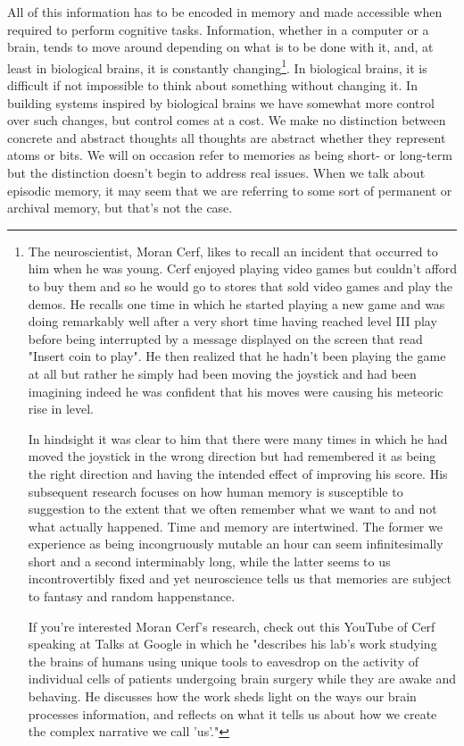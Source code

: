 All of this information has to be encoded in memory and made accessible when required to perform cognitive tasks. Information, whether in a computer or a brain, tends to move around depending on what is to be done with it, and, at least in biological brains, it is constantly changing\footnote{%
%
  The neuroscientist, Moran Cerf, likes to recall an incident that occurred to him when he was young. Cerf enjoyed playing video games but couldn't afford to buy them and so he would go to stores that sold video games and play the demos. He recalls one time in which he started playing a new game and was doing remarkably well after a very short time having reached level III play before being interrupted by a message displayed on the screen that read "Insert coin to play". He then realized that he hadn't been playing the game at all but rather he simply had been moving the joystick and had been imagining \emdash{} indeed he was confident that \emdash{} his moves were causing his meteoric rise in level.

  In hindsight it was clear to him that there were many times in which he had moved the joystick in the wrong direction but had remembered it as being the right direction and having the intended effect of improving his score. His subsequent research focuses on how human memory is susceptible to suggestion to the extent that we often remember what we want to and not what actually happened. Time and memory are intertwined. The former we experience as being incongruously mutable \emdash{} an hour can seem infinitesimally short and a second interminably long, while the latter seems to us incontrovertibly fixed and yet neuroscience tells us that memories are subject to fantasy and random happenstance. 

  If you're interested Moran Cerf's research, check out this YouTube{} of Cerf speaking at Talks at Google in which he "describes his lab's work studying the brains of humans using unique tools to eavesdrop on the activity of individual cells of patients undergoing brain surgery while they are awake and behaving. He discusses how the work sheds light on the ways our brain processes information, and reflects on what it tells us about how we create the complex narrative we call 'us'."}.
%
In biological brains, it is difficult if not impossible to think about something without changing it. In building systems inspired by biological brains we have somewhat more control over such changes, but control comes at a cost. We make no distinction between concrete and abstract thoughts \emdash{} all thoughts are abstract whether they represent atoms or bits. We will on occasion refer to memories as being short- or long-term but the distinction doesn't begin to address real issues. When we talk about episodic memory, it may seem that we are referring to some sort of permanent or archival memory, but that's not the case.

